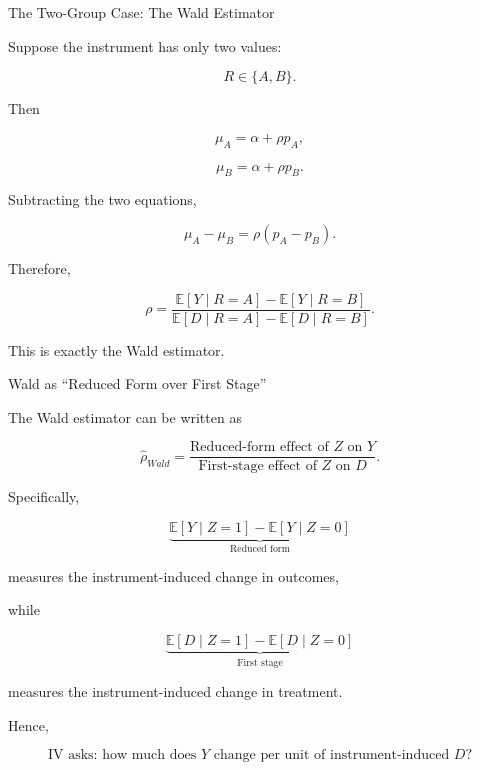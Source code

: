 \documentclass[aspectratio=169]{beamer}
\newcommand{\E}{\mathbb{E}}
\begin{document}
\begin{frame}{The Two-Group Case: The Wald Estimator}

Suppose the instrument has only two values:

\[
R\in\{A,B\}.
\]

Then

\[
\mu_A=\alpha+\rho p_A,
\]

\[
\mu_B=\alpha+\rho p_B.
\]

Subtracting the two equations,

\[
\mu_A-\mu_B
=
\rho(p_A-p_B).
\]

Therefore,

\[
\boxed{
\rho
=
\frac{
\E[Y\mid R=A]-\E[Y\mid R=B]
}{
\E[D\mid R=A]-\E[D\mid R=B]
}.
}
\]

This is exactly the Wald estimator.

\end{frame}

\begin{frame}{Wald as ``Reduced Form over First Stage''}

The Wald estimator can be written as

\[
\boxed{
\hat{\rho}_{Wald}
=
\frac{\text{Reduced-form effect of }Z\text{ on }Y}
{\text{First-stage effect of }Z\text{ on }D}.
}
\]

Specifically,

\[
\underbrace{
\E[Y\mid Z=1]-\E[Y\mid Z=0]
}_{\text{Reduced form}}
\]

measures the instrument-induced change in outcomes,

while

\[
\underbrace{
\E[D\mid Z=1]-\E[D\mid Z=0]
}_{\text{First stage}}
\]

measures the instrument-induced change in treatment.

Hence,

\[
\boxed{
\text{IV asks: how much does }Y\text{ change per unit of instrument-induced }D?
}
\]

\end{frame}
\end{document}
